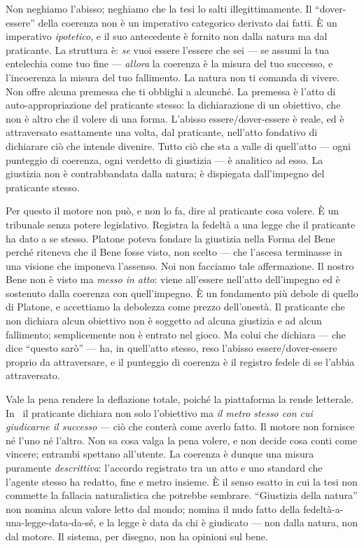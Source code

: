 Non neghiamo l'abisso; neghiamo che la tesi lo salti illegittimamente. Il
``dover-essere'' della coerenza non \`e un imperativo categorico derivato dai
fatti. \`E un imperativo \emph{ipotetico}, e il suo antecedente \`e fornito non
dalla natura ma dal praticante. La struttura \`e: \emph{se} vuoi essere l'essere
che sei --- se assumi la tua entelechia come tuo fine --- \emph{allora} la
coerenza \`e la misura del tuo successo, e l'incoerenza la misura del tuo
fallimento. La natura non ti comanda di vivere. Non offre alcuna premessa che ti
obblighi a alcunch\'e. La premessa \`e l'atto di auto-appropriazione del
praticante stesso: la dichiarazione di un obiettivo, che non \`e altro che il
volere di una forma. L'abisso essere/dover-essere \`e reale, ed \`e attraversato
esattamente una volta, dal praticante, nell'atto fondativo di dichiarare ci\`o
che intende divenire. Tutto ci\`o che sta a valle di quell'atto --- ogni
punteggio di coerenza, ogni verdetto di giustizia --- \`e analitico ad esso. La
giustizia non \`e contrabbandata dalla natura; \`e dispiegata dall'impegno del
praticante stesso.

Per questo il motore non pu\`o, e non lo fa, dire al praticante cosa volere. \`E
un tribunale senza potere legislativo. Registra la fedelt\`a a una legge che il
praticante ha dato a se stesso. Platone poteva fondare la giustizia nella Forma
del Bene perch\'e riteneva che il Bene fosse visto, non scelto --- che l'ascesa
terminasse in una visione che imponeva l'assenso. Noi non facciamo tale
affermazione. Il nostro Bene non \`e visto ma \emph{messo in atto}: viene
all'essere nell'atto dell'impegno ed \`e sostenuto dalla coerenza con
quell'impegno. \`E un fondamento pi\`u debole di quello di Platone, e accettiamo
la debolezza come prezzo dell'onest\`a. Il praticante che non dichiara alcun
obiettivo non \`e soggetto ad alcuna giustizia e ad alcun fallimento; semplicemente
non \`e entrato nel gioco. Ma colui che dichiara --- che dice ``questo sar\`o'' ---
ha, in quell'atto stesso, reso l'abisso essere/dover-essere proprio da
attraversare, e il punteggio di coerenza \`e il registro fedele di se l'abbia
attraversato.

Vale la pena rendere la deflazione totale, poich\'e la piattaforma la rende
letterale. In \praxis\ il praticante dichiara non solo l'obiettivo ma \emph{il metro
stesso con cui giudicarne il successo} --- ci\`o che conter\`a come averlo fatto. Il
motore non fornisce n\'e l'uno n\'e l'altro. Non sa cosa valga la pena volere, e non
decide cosa conti come vincere; entrambi spettano all'utente. La coerenza \`e dunque
una misura puramente \emph{descrittiva}: l'accordo registrato tra un atto e uno
standard che l'agente stesso ha redatto, fine e metro insieme. \`E il senso esatto in
cui la tesi non commette la fallacia naturalistica che potrebbe sembrare. ``Giustizia
della natura'' non nomina alcun valore letto dal mondo; nomina il nudo fatto della
fedelt\`a-a-una-legge-data-da-s\'e, e la legge \`e data da chi \`e giudicato --- non
dalla natura, non dal motore. Il sistema, per disegno, non ha opinioni sul bene.


